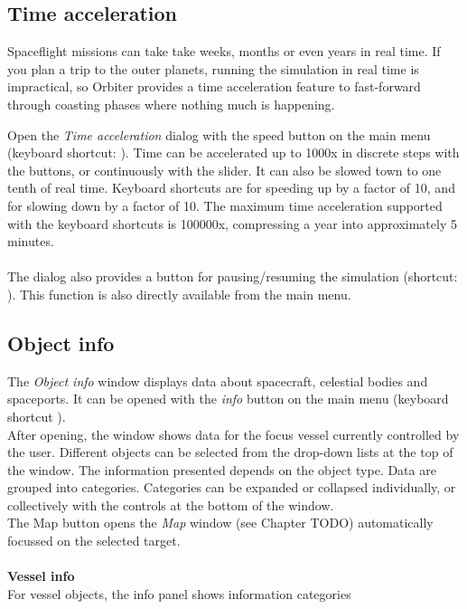 \documentclass[Orbiter User Manual.tex]{subfiles}
\begin{document}
\subsection{Time acceleration}
Spaceflight missions can take take weeks, months or even years in real time. If you plan a trip to the outer planets, running the simulation in real time is impractical, so Orbiter provides a time acceleration feature to fast-forward through coasting phases where nothing much is happening.

\begin{figure}[H]
	\centering
\end{figure}

\noindent
Open the \textit{Time acceleration} dialog with the speed button on the main menu (keyboard shortcut: \Ctrl{}). Time can be accelerated up to 1000x in discrete steps with the buttons, or continuously with the slider. It can also be slowed town to one tenth of real time. Keyboard shortcuts are  for speeding up by a factor of 10, and  for slowing down by a factor of 10. The maximum time acceleration supported with the keyboard shortcuts is 100000x, compressing a year into approximately 5 minutes.
\\
\noindent
\\
The dialog also provides a button for pausing/resuming the simulation (shortcut: \Ctrl{}). This function is also directly available from the main menu.


\subsection{Object info}
The \textit{Object info} window displays data about spacecraft, celestial bodies and spaceports. It can be opened with the \textit{info} button on the main menu (keyboard shortcut \Ctrl{}).\\
After opening, the window shows data for the focus vessel currently controlled by the user. Different objects can be selected from the drop-down lists at the top of the window. The information presented depends on the object type. Data are grouped into categories. Categories can be expanded or collapsed individually, or collectively with the controls at the bottom of the window.\\
The Map button opens the \textit{Map} window (see Chapter TODO) automatically focussed on the selected target.\\
\\
\textbf{Vessel info}\\
For vessel objects, the info panel shows information categories
\end{document}
